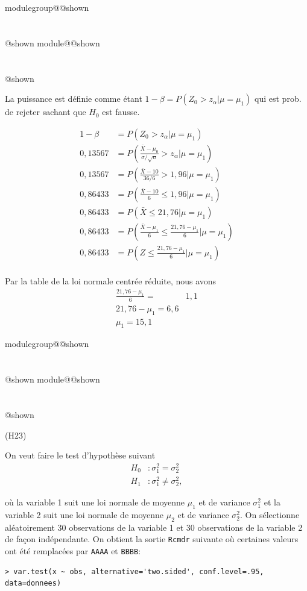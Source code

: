 \documentclass{Evaluation}
\makeatletter
\newcommand{\currentmodulekey}{}
\newcommand{\currentmoduletitle}{}
\newcommand{\currentgroupkey}{}
\newcommand{\currentgrouptitle}{}
\newcommand{\showmoduleifneeded}{%
  \ifx\currentgroupkey\empty\else
    \expandafter\ifx\csname modulegroup@\currentgroupkey @shown\endcsname\relax
      \section*{\currentgrouptitle}%
      \expandafter\gdef\csname modulegroup@\currentgroupkey @shown\endcsname{1}%
    \fi
  \fi
  \expandafter\ifx\csname module@\currentmodulekey @shown\endcsname\relax
    \section*{\currentmoduletitle}%
    \expandafter\gdef\csname module@\currentmodulekey @shown\endcsname{1}%
  \fi
}
\newenvironment{H23}{\showmoduleifneeded}{}
\makeatother
\begin{document}
\begin{questions}
\begin{H23}
\begin{solution}
    La puissance est définie comme étant $1-\beta=P(Z_0>z_{\alpha}|\mu=\mu_1)$ qui est prob. de rejeter sachant que $H_0$ est fausse.

    \begin{align*}
        1-\beta &= P(Z_0>z_{\alpha}|\mu=\mu_1)\\
        0,13567&= P\left(\frac{\bar{X}-\mu_0}{\sigma/\sqrt{n}}>z_{\alpha}|\mu=\mu_1\right)\\
        0,13567&= P\left(\frac{\bar{X}-10}{36/6}>1,96|\mu=\mu_1\right)\\
        0,86433&= P\left(\frac{\bar{X}-10}{6}\leq1,96|\mu=\mu_1\right)\\
        0,86433&= P\left(\bar{X}\leq21,76|\mu=\mu_1\right)\\
        0,86433&=P\left(\frac{\bar{X}-\mu_1}{6}\leq\frac{21,76-\mu_1}{6}|\mu=\mu_1\right)\\
        0,86433&=P\left(Z\leq\frac{21,76-\mu_1}{6}|\mu=\mu_1\right)\\
    \end{align*}

Par la table de la loi normale centrée réduite, nous avons
\begin{align*}
    \frac{21,76-\mu_1}{6}=&1,1\\
    21,76-\mu_1=6,6\\
    \mu_1 =15,1
\end{align*}
\end{solution}
\end{H23}

\begin{H23}
\question
(H23)

On veut faire le test d'hypothèse suivant 
\begin{align*}
H_0 &:\sigma_1^2 = \sigma_2^2\\
H_1 &:\sigma_1^2 \neq \sigma_2^2,
\end{align*}

où la variable 1 suit une loi normale de moyenne $\mu_1$ et de variance $\sigma_1^2$ et la variable 2 suit une loi normale de moyenne $\mu_2$ et de variance $\sigma_2^2$. On sélectionne aléatoirement 30 observations de la variable 1 et 30 observations de la variable 2 de façon indépendante. On obtient la sortie \texttt{Rcmdr} suivante où certaines valeurs ont été remplacées par \texttt{AAAA} et \texttt{BBBB}:

\begin{verbatim}
> var.test(x ~ obs, alternative='two.sided', conf.level=.95, data=donnees)


\end{verbatim}
\end{H23}
\end{questions}
\end{document}
